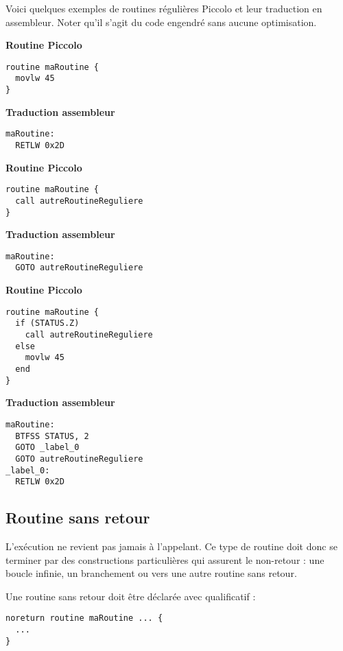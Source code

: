 Voici quelques exemples de routines régulières Piccolo et leur traduction en assembleur. Noter qu'il s'agit du code engendré sans aucune optimisation.
\begin{multicols}{2}
\textbf{Routine Piccolo}
\begin{lstlisting}[language=piccolo]
routine maRoutine {
  movlw 45
}
\end{lstlisting}
\columnbreak
\textbf{Traduction assembleur}
\begin{lstlisting}[language=assembleur]
maRoutine:
  RETLW 0x2D
\end{lstlisting}
\end{multicols}

\begin{multicols}{2}
\textbf{Routine Piccolo}
\begin{lstlisting}[language=piccolo]
routine maRoutine {
  call autreRoutineReguliere
}
\end{lstlisting}
\columnbreak
\textbf{Traduction assembleur}
\begin{lstlisting}[language=assembleur]
maRoutine:
  GOTO autreRoutineReguliere
\end{lstlisting}
\end{multicols}


\begin{multicols}{2}
\textbf{Routine Piccolo}
\begin{lstlisting}[language=piccolo]
routine maRoutine {
  if (STATUS.Z)
    call autreRoutineReguliere
  else
    movlw 45
  end
}
\end{lstlisting}
\columnbreak
\textbf{Traduction assembleur}
\begin{lstlisting}[language=assembleur]
maRoutine:
  BTFSS STATUS, 2
  GOTO _label_0
  GOTO autreRoutineReguliere
_label_0:
  RETLW 0x2D
\end{lstlisting}
\end{multicols}


\subsection{Routine sans retour}

L’exécution ne revient pas jamais à l’appelant. Ce type de routine doit donc se terminer par des constructions particulières qui assurent le non-retour : une boucle infinie, un branchement  ou  vers une autre routine sans retour.

Une routine sans retour doit être déclarée avec qualificatif  :
\begin{lstlisting}[language=piccolo]
noreturn routine maRoutine ... {
  ...
}
\end{lstlisting}

